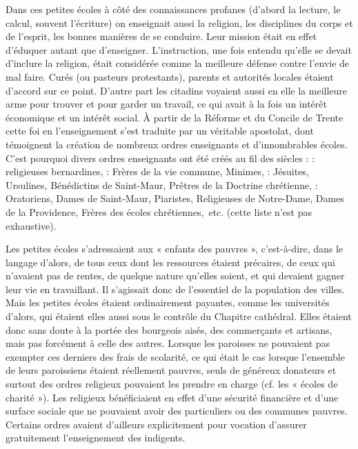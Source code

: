 Dans ces petites écoles à côté des connaissances profanes (d'abord la lecture, le calcul, souvent l'écriture) on enseignait aussi la religion, les disciplines du corps et de l'esprit, les bonnes manières de se conduire. Leur mission était en effet d'éduquer autant que d'enseigner. L'instruction, une fois entendu qu'elle se devait d'inclure la religion, était considérée comme la meilleure défense contre l'envie de mal faire. Curés (ou pasteurs protestants), parents et autorités locales étaient d'accord sur ce point. D'autre part les citadins voyaient aussi en elle la meilleure arme pour trouver et pour garder un travail, ce qui avait à la fois un intérêt économique et un intérêt social. À partir de la Réforme et du Concile de Trente cette foi en l'enseignement s'est traduite par un véritable apostolat, dont témoignent la création de nombreux ordres enseignants et d'innombrables écoles. C'est pourquoi divers ordres enseignants ont été créés au fil des siècles :
 : religieuses bernardines,
 : Frères de la vie commune, Minimes,
 : Jésuites, Ursulines, Bénédictins de Saint-Maur, Prêtres de la Doctrine chrétienne,
 : Oratoriens, Dames de Saint-Maur, Piaristes, Religieuses de Notre-Dame, Dames de la Providence, Frères des écoles chrétiennes,~etc. (cette liste n'est pas exhaustive).

 Les petites écoles s'adressaient aux « enfants des pauvres », c'est-à-dire, dans le langage d'alors, de tous ceux dont les ressources étaient précaires, de ceux qui n'avaient pas de rentes, de quelque nature qu'elles soient, et qui devaient gagner leur vie en travaillant. Il s'agissait donc de l'essentiel de la population des villes. Mais les petites écoles étaient ordinairement payantes, comme les universités d'alors, qui étaient elles aussi sous le contrôle du Chapitre cathédral. Elles étaient donc sans doute à la portée des bourgeois aisés, des commerçants et artisans, mais pas forcément à celle des autres. Lorsque les paroisses ne pouvaient pas exempter ces derniers des frais de scolarité, ce qui était le cas lorsque l'ensemble de leurs paroissiens étaient réellement pauvres, seuls de généreux donateurs et surtout des ordres religieux pouvaient les prendre en charge (cf.  les « écoles de charité »). Les religieux bénéficiaient en effet d'une sécurité financière et d'une surface sociale que ne pouvaient avoir des particuliers ou des communes pauvres. Certains ordres avaient d'ailleurs explicitement pour vocation d'assurer gratuitement l'enseignement des indigents.

